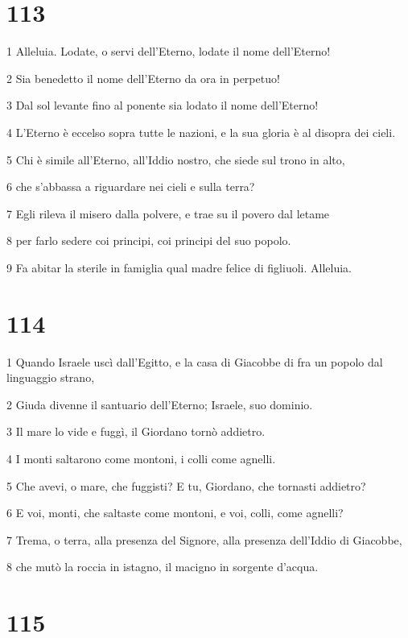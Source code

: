 \chapter{113}

\par 1 Alleluia. Lodate, o servi dell'Eterno, lodate il nome dell'Eterno!
\par 2 Sia benedetto il nome dell'Eterno da ora in perpetuo!
\par 3 Dal sol levante fino al ponente sia lodato il nome dell'Eterno!
\par 4 L'Eterno è eccelso sopra tutte le nazioni, e la sua gloria è al disopra dei cieli.
\par 5 Chi è simile all'Eterno, all'Iddio nostro, che siede sul trono in alto,
\par 6 che s'abbassa a riguardare nei cieli e sulla terra?
\par 7 Egli rileva il misero dalla polvere, e trae su il povero dal letame
\par 8 per farlo sedere coi principi, coi principi del suo popolo.
\par 9 Fa abitar la sterile in famiglia qual madre felice di figliuoli. Alleluia.

\chapter{114}

\par 1 Quando Israele uscì dall'Egitto, e la casa di Giacobbe di fra un popolo dal linguaggio strano,
\par 2 Giuda divenne il santuario dell'Eterno; Israele, suo dominio.
\par 3 Il mare lo vide e fuggì, il Giordano tornò addietro.
\par 4 I monti saltarono come montoni, i colli come agnelli.
\par 5 Che avevi, o mare, che fuggisti? E tu, Giordano, che tornasti addietro?
\par 6 E voi, monti, che saltaste come montoni, e voi, colli, come agnelli?
\par 7 Trema, o terra, alla presenza del Signore, alla presenza dell'Iddio di Giacobbe,
\par 8 che mutò la roccia in istagno, il macigno in sorgente d'acqua.

\chapter{115}

